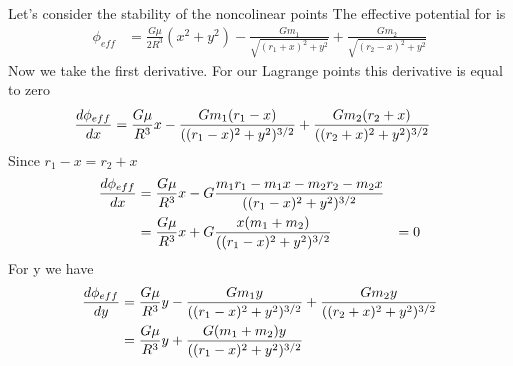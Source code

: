 Let's consider the stability of the noncolinear points
The effective potential for is
\begin{align}
\phi_{eff} &= \frac{G\mu}{2R^3}(x^2 + y^2) - \frac{Gm_1}{\sqrt{(r_1 + x)^2 + y^2}} + \frac{Gm_2}{\sqrt{(r_2 - x)^2 + y^2}}
\end{align}
Now we take the first derivative. For our Lagrange points this derivative is equal to zero
\begin{align}
\frac{d \phi_{eff}}{d x} &= \frac{G\mu}{R^3}x - \frac{Gm_1 (r_1-x)}{((r_1 - x)^2 + y^2)^{3/2}} + \frac{Gm_2(r_2 + x)}{((r_2 + x)^2 + y^2)^{3/2}}
\end{align}
Since $r_1 - x = r_2 + x$
\begin{align}
\frac{d \phi_{eff}}{d x} &= \frac{G\mu}{R^3}x - G\frac{m_1  r_1- m_1x - m_2 r_2 - m_2 x}{((r_1 - x)^2 + y^2)^{3/2}} \\ 
&= \frac{G\mu}{R^3}x + G\frac{ x(m_1 + m_2)}{((r_1 - x)^2 + y^2)^{3/2}} &= 0 \\ 
\end{align}
For y we have
\begin{align}
\frac{d \phi_{eff}}{d y} &= \frac{G\mu}{R^3} y - \frac{Gm_1y}{((r_1 -x)^2 + y^2)^{3/2}} + \frac{Gm_2 y }{((r_2 + x)^2 + y^2)^{3/2}}\\
&= \frac{G\mu}{R^3} y + \frac{G(m_1 + m_2)y}{((r_1 -x)^2 + y^2)^{3/2}} 
\end{align}


